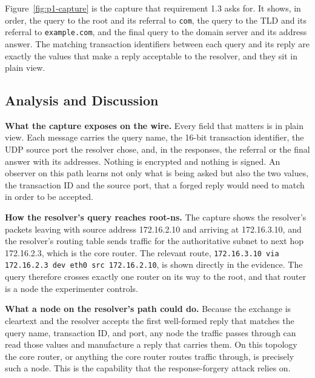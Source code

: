 \documentclass[11pt]{article}
\begin{document}

Figure~\ref{fig:p1-capture} is the capture that requirement 1.3
asks for. It shows, in order, the query to the root and its referral to
\texttt{com}, the query to the TLD and its referral to \texttt{example.com}, and
the final query to the domain server and its address answer. The matching
transaction identifiers between each query and its reply are exactly the values
that make a reply acceptable to the resolver, and they sit in plain view.

\subsection{Analysis and Discussion}

\textbf{What the capture exposes on the wire.} Every field that matters is in
plain view. Each message carries the query name, the 16-bit transaction
identifier, the UDP source port the resolver chose, and, in the responses, the
referral or the final answer with its addresses. Nothing is encrypted and nothing
is signed. An observer on this path learns not only what is being asked but also
the two values, the transaction ID and the source port, that a forged reply would
need to match in order to be accepted.

\textbf{How the resolver's query reaches root-ns.} The capture shows the
resolver's packets leaving with source address 172.16.2.10 and arriving at
172.16.3.10, and the resolver's routing table sends traffic for the authoritative
subnet to next hop 172.16.2.3, which is the core router. The relevant route,
\texttt{172.16.3.10 via 172.16.2.3 dev eth0 src 172.16.2.10}, is shown directly in
the evidence. The query therefore crosses exactly one router on its way to the
root, and that router is a node the experimenter controls.

\textbf{What a node on the resolver's path could do.} Because the exchange is
cleartext and the resolver accepts the first well-formed reply that matches the
query name, transaction ID, and port, any node the traffic passes through can read
those values and manufacture a reply that carries them. On this topology the core
router, or anything the core router routes traffic through, is precisely such a
node. This is the capability that the response-forgery attack relies on.
\end{document}
